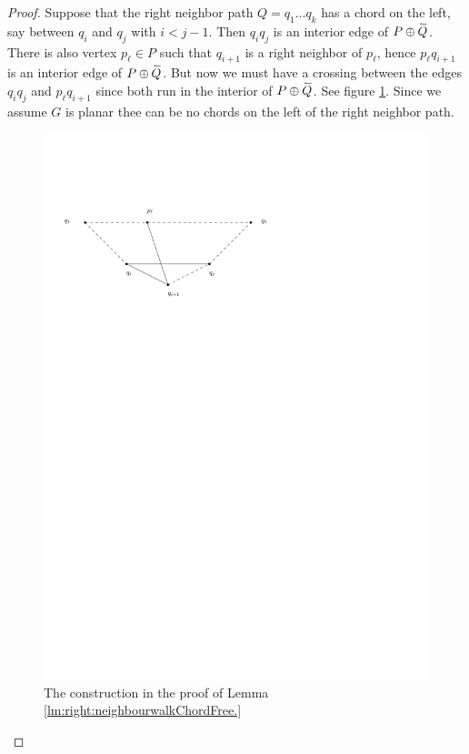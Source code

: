     \begin{proof}
      Suppose that the right neighbor path $Q = q_1 \ldots q_k$  has a chord on the left, say between $q_i$ and $q_j$ with $i< j -1 $. Then $q_i q_j$ is an interior edge of $P \oplus \accentset{\leftharpoonup}{Q}$.  There is also vertex $p_\ell \in P$ such that $q_{i+1}$ is a right neighbor of $p_\ell$, hence $p_\ell q_{i+1}$ is an interior edge of $P \oplus \accentset{\leftharpoonup}{Q}$.  But now we must have a crossing between the edges $q_i q_j$ and $p_\ell q_{i+1}$ since both run in the interior of $P \oplus \accentset{\leftharpoonup}{Q}$.
      See figure \ref{fig:uni:neihbourwalkChordFree}.
      Since we assume $G$ is planar thee can be no chords on the left of the right neighbor path.

      \begin{figure}[h]
        \centering
        \includegraphics[scale=1]{unifiedAlgo/img/rightNeighbourwalk/neighbourWalkChords}
        \caption{The construction in the proof of Lemma \ref{lm:right:neighbourwalkChordFree.}}
        \label{fig:uni:neihbourwalkChordFree}
      \end{figure}
    \end{proof}
